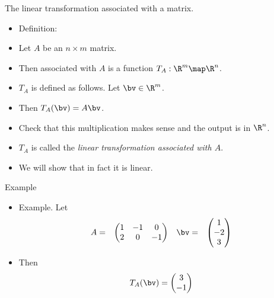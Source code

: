 \documentclass{beamer}
\begin{document}
\begin{frame}{The linear transformation associated with a matrix.}

\begin{itemize}
\item Definition:
\item Let $A$ be an $n\times m$ matrix.
\item Then associated with $A$ is a function $T_A:\R^m\map\R^n$.
\item $T_A$ is defined as follows. Let $\bv\in\R^m$.
\item Then $T_A(\bv) = A \bv$.
\item Check that this multiplication makes sense and the output is in $\R^n$.
\item $T_A$ is called the \emph{linear transformation associated with $A$}.
\item We will show that in fact it is linear.
\end{itemize}
\end{frame}


\begin{frame}{Example}

\begin{itemize}
\item Example. Let
$$
\begin{matrix}
A =
&
\begin{pmatrix}
1 & -1  & 0 \\
2 &  0  & -1
\end{pmatrix}
&
\bv =
&
\begin{pmatrix}
1 \\ -2 \\ 3
\end{pmatrix}
\end{matrix}
$$
\item Then
$$
T_A(\bv) =
\begin{pmatrix}
3 \\-1
\end{pmatrix}
$$
\end{itemize}

\end{frame}
\end{document}
